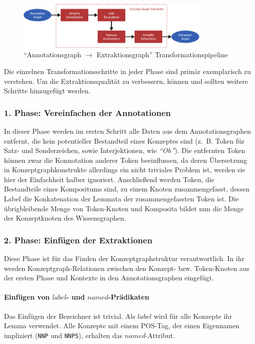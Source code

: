 \begin{figure}[h]
	\centering
	\includegraphics[width=0.84\textwidth]{gfx/text2kg/transformationPipeline.pdf}
	\caption{``Annotationsgraph $\rightarrow$ Extraktionsgraph'' Transformationspipeline}\label{fig:text2kg:transformationPipeline}
\end{figure}
Die einzelnen Transformationsschritte in jeder Phase sind primär exemplarisch zu verstehen.
Um die Extraktionsqualität zu verbessern, können und sollten weitere Schritte hinzugefügt werden.

\subsubsection{1. Phase: Vereinfachen der Annotationen}
In dieser Phase werden im ersten Schritt alle Daten aus dem Annotationsgraphen entfernt, die kein potentieller Bestandteil eines Konzeptes sind (z.~B. Token für Satz- und Sonderzeichen, sowie Interjektionen, wie \textit{``Oh''}).
Die entfernten Token können zwar die Konnotation anderer Token beeinflussen, da deren Übersetzung in Konzeptgraphkonstrukte allerdings ein nicht triviales Problem ist, werden sie hier der Einfachheit halber ignoriert.
Anschließend werden Token, die Bestandteile eines Kompositums sind, zu einem Knoten zusammengefasst, dessen Label die Konkatenation der Lemmata der zusammengefassten Token ist.
Die übrigbleibende Menge von Token-Knoten und Komposita bildet nun die Menge der Konzeptknoten des Wissensgraphen.

\subsubsection{2. Phase: Einfügen der Extraktionen}
Diese Phase ist für das Finden der Konzeptgraphstruktur verantwortlich.
In ihr werden Konzeptgraph-Relationen zwischen den Konzept- bzw. Token-Knoten aus der ersten Phase und Kontexte in den Annotationsgraphen eingefügt.

\paragraph{Einfügen von $label$- und $named$-Prädikaten}
Das Einfügen der Bezeichner ist trivial.
Als $label$ wird für alle Konzepte ihr Lemma verwendet.
Alle Konzepte mit einem POS-Tag, der einen Eigennamen impliziert (\texttt{NNP} und \texttt{NNPS}), erhalten das $named$-Attribut.

